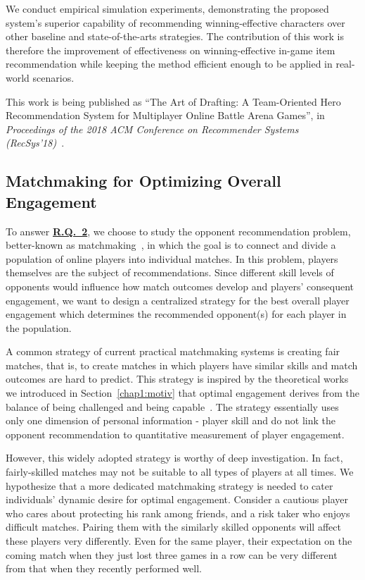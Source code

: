 We conduct empirical simulation experiments, demonstrating the proposed system's superior capability of recommending winning-effective characters over other baseline and state-of-the-arts strategies. The contribution of this work is therefore the improvement of effectiveness on winning-effective in-game item recommendation while keeping the method efficient enough to be applied in real-world scenarios.

This work is being published as ``The Art of Drafting: A Team-Oriented Hero Recommendation System for Multiplayer Online Battle Arena Games'', in \textit{Proceedings of the 2018 ACM Conference on Recommender Systems (RecSys'18)}~\cite{chen2018draft}.



\subsection{Matchmaking for Optimizing Overall Engagement}\label{sec:thesis_overview:oppo_recom}

To answer \hyperref[rq2]{\textbf{R.Q.~2}}, we choose to study the opponent recommendation problem, better-known as matchmaking~\cite{medler2011using}, in which the goal is to connect and divide a population of online players into individual matches. In this problem, players themselves are the subject of recommendations. Since different skill levels of opponents would influence how match outcomes develop and players' consequent engagement, we want to design a centralized strategy for the best overall player engagement which determines the recommended opponent(s) for each player in the population. 

A common strategy of current practical matchmaking systems is creating fair matches, that is, to create matches in which players have similar skills and match outcomes are hard to predict. This strategy is inspired by the theoretical works we introduced in Section~\ref{chap1:motiv} that optimal engagement derives from the balance of being challenged and being capable~\cite{sweetser2005gameflow,flow1990psychology,chen2007flow,graepel2006ranking}. The strategy essentially uses only one dimension of personal information - player skill and do not link the opponent recommendation to quantitative measurement of player engagement. 

However, this widely adopted strategy is worthy of deep investigation. In fact, fairly-skilled matches may not be suitable to all types of players at all times. We hypothesize that a more dedicated matchmaking strategy is needed to cater individuals' dynamic desire for optimal engagement. Consider a cautious player who cares about protecting his rank among friends, and a risk taker who enjoys difficult matches. Pairing them with the similarly skilled opponents will affect these players very differently. Even for the same player, their expectation on the coming match when they just lost three games in a row can be very different from that when they recently performed well. 

